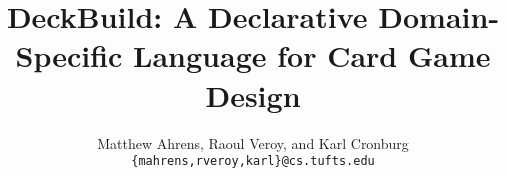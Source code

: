 \documentclass[aps,twocolumn,amsmath,amssymb]{revtex4}
\begin{document}
\title{DeckBuild: A Declarative Domain-Specific Language for Card Game Design}

\author{
  Matthew Ahrens, Raoul Veroy, and Karl Cronburg\\
  \texttt{\{mahrens,rveroy,karl\}@cs.tufts.edu}\\
}

\begin{abstract}
\end{abstract}

\maketitle





%
%



\end{document}
